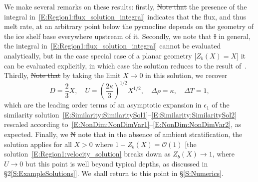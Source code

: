 \documentclass[openacc]{rsproca_new}%
\newcommand{\red}[1]{{\color{red} #1}}
\newcommand{\blue}[1]{{\color{blue} #1}}
\newcommand{\rout}[1]{\red{\st{#1}}}\newcommand{\ab}[1]{\textcolor{Green}{#1}}\newcommand{\about}[1]{\textcolor{Cyan}{\sout{#1}}}
\newcommand{\epsone}{\epsilon_{1}} %
\begin{document}
\blue{We make several remarks on these results: firstly,} \rout{Note that }the presence of the integral in~\eqref{E:Region1:flux_solution_integral} indicates that the flux, and thus melt rate, at an arbitrary point below the pycnocline depends on the geometry of the ice shelf base everywhere upstream of it. \blue{Secondly, we note that }\rout{I}\blue{i}n general, the integral in~\eqref{E:Region1:flux_solution_integral} cannot be evaluated analytically, but in the case special case of a planar geometry [$Z_b(X) = X$] \blue{it can be evaluated explicitly, in which case the solution reduces to the result of}~\cite{Lazeroms2019JPhysOcean}. \blue{Thirdly, }\rout{Note that }by taking the limit $X \to 0$ in this solution, we recover 
\begin{equation}\label{E:Region1:dimensionless_similarity}
D = \frac{2}{3}X, \quad U = \left(\frac{2\kappa}{3}\right)^{1/2}X^{1/2}, \quad \Delta \rho = \kappa, \quad \Delta T = 1,
\end{equation} 
which are the leading order terms of an asymptotic expansion in $\epsone$ of the similarity solution~\eqref{E:Similarity:SimilaritySol1}--\eqref{E:Similarity:SimilaritySol2} rescaled according to~\eqref{E:NonDim:NonDimVar1}--\eqref{E:NonDim:NonDimVar2}, as expected. \blue{Finally, we }\rout{N}\blue{n}ote that in the absence of ambient stratification, the solution applies for all $X> 0$ where $1 - Z_b(X) = \mathcal{O}(1)$ [the solution~\eqref{E:Region1:velocity_solution} breaks down as $Z_b(X) \to 1$, where $U \to 0$ but this point is well beyond typical depths, as discussed in \S2\ref{S:ExampleSolutions}]. We shall return to this point in \S\ref{S:Numerics}.
\end{document}
